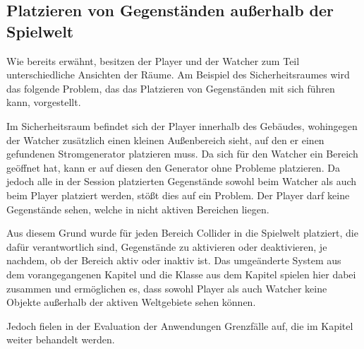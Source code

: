 \subsection{Platzieren von Gegenständen außerhalb der Spielwelt}\label{sec:difficulties-placement}
Wie bereits erwähnt, besitzen der Player und der Watcher zum Teil unterschiedliche Ansichten der Räume. Am Beispiel des Sicherheitsraumes wird das folgende Problem, das das Platzieren von Gegenständen mit sich führen kann, vorgestellt. 

Im Sicherheitsraum befindet sich der Player innerhalb des Gebäudes, wohingegen der Watcher zusätzlich einen kleinen Außenbereich sieht, auf den er einen gefundenen Stromgenerator platzieren muss. Da sich für den Watcher ein Bereich geöffnet hat, kann er auf diesen den Generator ohne Probleme platzieren. Da jedoch alle in der Session platzierten Gegenstände sowohl beim Watcher als auch beim Player platziert werden, stößt dies auf ein Problem. Der Player darf keine Gegenstände sehen, welche in nicht aktiven Bereichen liegen. 

Aus diesem Grund wurde für jeden Bereich Collider in die Spielwelt platziert, die dafür verantwortlich sind, Gegenstände zu aktivieren oder deaktivieren, je nachdem, ob der Bereich aktiv oder inaktiv ist. Das umgeänderte System aus dem vorangegangenen Kapitel  und die Klasse  aus dem Kapitel  spielen hier dabei zusammen und ermöglichen es, dass sowohl Player als auch Watcher keine  Objekte außerhalb der aktiven Weltgebiete sehen können.

Jedoch fielen in der Evaluation der Anwendungen Grenzfälle auf, die im Kapitel  weiter behandelt werden.














